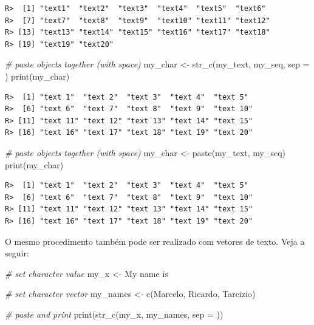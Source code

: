 \documentclass[
  11pt,
]{book}
\newenvironment{Shaded}{\begin{snugshade}}{\end{snugshade}}
\newcommand{\AttributeTok}[1]{\textcolor[rgb]{0.61,0.61,0.61}{#1}}
\newcommand{\CommentTok}[1]{\textcolor[rgb]{0.37,0.37,0.37}{\textit{#1}}}
\newcommand{\FunctionTok}[1]{\textcolor[rgb]{0,0,0}{#1}}
\newcommand{\NormalTok}[1]{#1}
\newcommand{\OtherTok}[1]{\textcolor[rgb]{0.37,0.37,0.37}{#1}}
\newcommand{\StringTok}[1]{\textcolor[rgb]{0.5,0.5,0.5}{#1}}
\begin{document}
\begin{verbatim}
R>  [1] "text1"  "text2"  "text3"  "text4"  "text5"  "text6" 
R>  [7] "text7"  "text8"  "text9"  "text10" "text11" "text12"
R> [13] "text13" "text14" "text15" "text16" "text17" "text18"
R> [19] "text19" "text20"
\end{verbatim}

\begin{Shaded}
\begin{Highlighting}[]
\CommentTok{\# paste objects together (with space)}
\NormalTok{my\_char }\OtherTok{\textless{}{-}} \FunctionTok{str\_c}\NormalTok{(my\_text, my\_seq, }\AttributeTok{sep =} \StringTok{\textquotesingle{} \textquotesingle{}}\NormalTok{)}
\FunctionTok{print}\NormalTok{(my\_char)}
\end{Highlighting}
\end{Shaded}

\begin{verbatim}
R>  [1] "text 1"  "text 2"  "text 3"  "text 4"  "text 5" 
R>  [6] "text 6"  "text 7"  "text 8"  "text 9"  "text 10"
R> [11] "text 11" "text 12" "text 13" "text 14" "text 15"
R> [16] "text 16" "text 17" "text 18" "text 19" "text 20"
\end{verbatim}

\begin{Shaded}
\begin{Highlighting}[]
\CommentTok{\# paste objects together (with space)}
\NormalTok{my\_char }\OtherTok{\textless{}{-}} \FunctionTok{paste}\NormalTok{(my\_text, my\_seq)}
\FunctionTok{print}\NormalTok{(my\_char)}
\end{Highlighting}
\end{Shaded}

\begin{verbatim}
R>  [1] "text 1"  "text 2"  "text 3"  "text 4"  "text 5" 
R>  [6] "text 6"  "text 7"  "text 8"  "text 9"  "text 10"
R> [11] "text 11" "text 12" "text 13" "text 14" "text 15"
R> [16] "text 16" "text 17" "text 18" "text 19" "text 20"
\end{verbatim}

O mesmo procedimento também pode ser realizado com vetores de texto. Veja a seguir:

\begin{Shaded}
\begin{Highlighting}[]
\CommentTok{\# set character value}
\NormalTok{my\_x }\OtherTok{\textless{}{-}} \StringTok{\textquotesingle{}My name is\textquotesingle{}}

\CommentTok{\# set character vector}
\NormalTok{my\_names }\OtherTok{\textless{}{-}} \FunctionTok{c}\NormalTok{(}\StringTok{\textquotesingle{}Marcelo\textquotesingle{}}\NormalTok{, }\StringTok{\textquotesingle{}Ricardo\textquotesingle{}}\NormalTok{, }\StringTok{\textquotesingle{}Tarcizio\textquotesingle{}}\NormalTok{)}

\CommentTok{\# paste and print}
\FunctionTok{print}\NormalTok{(}\FunctionTok{str\_c}\NormalTok{(my\_x, my\_names, }\AttributeTok{sep =} \StringTok{\textquotesingle{} \textquotesingle{}}\NormalTok{))}
\end{Highlighting}
\end{Shaded}
\end{document}
